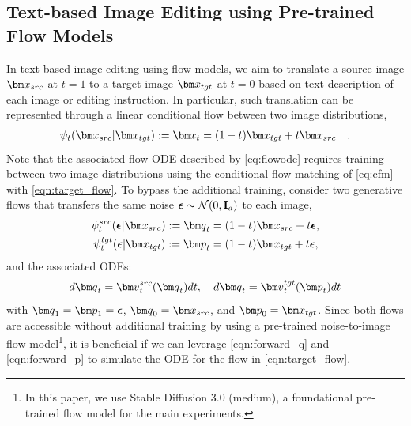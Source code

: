 \subsection{Text-based Image Editing using Pre-trained Flow Models}
In  text-based image editing using flow models, we aim to translate a source image $\vx_{src}$ at $t=1$ to a target image $\vx_{tgt}$ at $t=0$ based on text description of each image or editing instruction.
In particular, such translation can be represented through a linear conditional flow between two image distributions,
\begin{align}
    \psi_t(\vx_{src}|\vx_{tgt}) :=\vx_t = (1-t) \vx_{tgt} + t \vx_{src} \quad .
    \label{eqn:target_flow}
\end{align}
Note that the associated flow ODE described by \eqref{eq:flowode}
requires  training between two image distributions using the conditional flow matching
of \eqref{eq:cfm} with \eqref{eqn:target_flow}.
To bypass the additional training,
 consider two generative flows 
  that transfers the same noise ${\boldsymbol \epsilon}\sim\mathcal{N}(0, {\mathbf{I}}_d)$ to each image,
\begin{align}
    \label{eqn:forward_q}
     \psi_t^{src}(\epsilonb|\vx_{src}):=\vq_t &= (1-t) \vx_{src} + t \epsilonb, \\
     \label{eqn:forward_p}
     \psi_t^{tgt}(\epsilonb|\vx_{tgt}):=\vp_t &= (1-t) \vx_{tgt} + t \epsilonb,
\end{align}
and the associated ODEs:
\begin{align}\label{eq:aODE}
d\vq_t = \vv_t^{src}(\vq_t) dt ,\quad d\vq_t = \vv_t^{tgt}(\vp_t) dt 
\end{align}
with $\vq_1=\vp_1=\epsilonb$, $\vq_0 = \vx_{src}$, and $\vp_0=\vx_{tgt}$.
Since both flows are accessible without additional training by using a pre-trained noise-to-image  flow model\footnote{In this paper, we use Stable Diffusion 3.0 (medium), a foundational pre-trained flow model for the main experiments.},
it is beneficial if we can leverage \eqref{eqn:forward_q} and \eqref{eqn:forward_p} to simulate the  ODE for the flow in \eqref{eqn:target_flow}.

